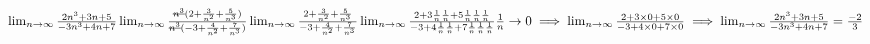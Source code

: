 \documentclass{article}
\newcommand{\stkout}[1]{\ifmmode\text{\sout{\ensuremath{#1}}}\else\sout{#1}\fi}
\begin{document}
    \begin{math}
        \\
        \lim_{n \to \infty} \frac{2n^3 + 3n + 5}{-3n^3 + 4n + 7}\\
        \\
        \lim_{n \to \infty} \frac{\stkout{n^3}(2 + \frac{3}{n^2} + \frac{5}{n^3})}{\stkout{n^3}(-3 + \frac{4}{n^2} + \frac{7}{n^3})}\\
        \\
        \lim_{n \to \infty} \frac{2 + \frac{3}{n^2} + \frac{5}{n^3}}{-3 + \frac{4}{n^2} + \frac{7}{n^3}}\\
        \\
        \lim_{n \to \infty} \frac{2 + 3\frac{1}{n}\frac{1}{n} + 5\frac{1}{n}\frac{1}{n}\frac{1}{n}}{-3 + 4\frac{1}{n}\frac{1}{n} + 7\frac{1}{n}\frac{1}{n}\frac{1}{n}}\\
        \\
        \frac{1}{n} \to 0 \implies \lim_{n \to \infty} \frac{2 + 3\times0 + 5\times0}{-3 + 4\times0 + 7\times0}\\
        \\
        \implies \lim_{n \to \infty} \frac{2n^3 + 3n + 5}{-3n^3 + 4n + 7} = \frac{-2}{3}
    \end{math}
\end{document}
